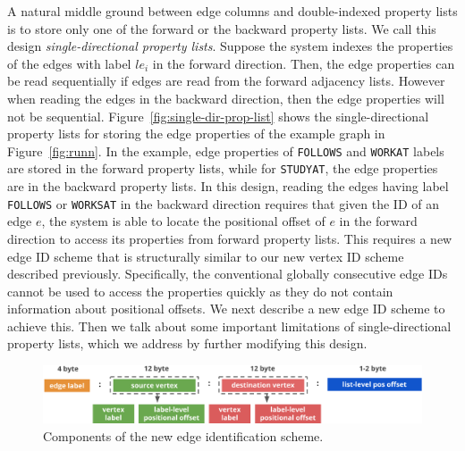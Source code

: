 A natural middle ground between edge columns and double-indexed property lists is to store only one of the forward or the backward property lists. We call this design \emph{single-directional property lists}. Suppose the system indexes the properties of the edges with label $le_i$ in the forward direction. Then, the edge properties can be read sequentially if edges are read from the forward adjacency lists. However when reading the edges in the backward direction, then the edge properties will not be sequential. Figure~\ref{fig:single-dir-prop-list} shows the single-directional property lists for storing the edge properties of the example graph in Figure~\ref{fig:runn}. In the example, edge properties of \texttt{FOLLOWS} and \texttt{WORKAT} labels are stored in the forward property lists, while for \texttt{STUDYAT}, the edge properties are in the backward property lists. In this design, reading the edges having label \texttt{FOLLOWS} or \texttt{WORKSAT} in the backward direction requires that given the ID of an edge $e$, the system is able to locate the positional offset of $e$ in the forward direction to access its properties from forward property lists. This requires a new edge ID scheme that is structurally similar to our new vertex ID scheme described previously. Specifically, the conventional globally consecutive edge IDs cannot be used to access the properties quickly as they do not contain information about positional offsets. We next describe a new edge ID scheme to achieve this. Then we talk about some important limitations of single-directional property lists, which we address by further modifying this design.

\begin{figure}
	\hfill\includegraphics[scale=0.78]{img/edge-scheme}\hspace*{\fill}
	\captionsetup{justification=centering}
	\caption{Components of the new edge identification scheme.}
	\label{fig:edge-scheme}
\end{figure}

